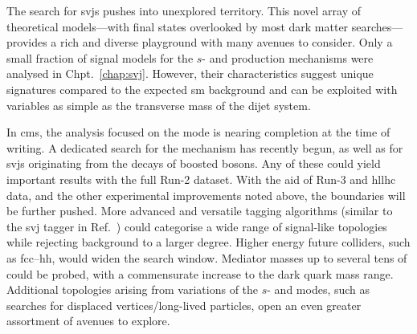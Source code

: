The search for \glspl{svj} pushes into unexplored territory. This novel array of theoretical models---with final states overlooked by most dark matter searches---provides a rich and diverse playground with many avenues to consider. Only a small fraction of signal models for the $s$- and \tchannel production mechanisms were analysed in Chpt.~\ref{chap:svj}. However, their characteristics suggest unique signatures compared to the expected \acrlong{sm} background and can be exploited with variables as simple as the transverse mass of the dijet system.

In \acrshort{cms}, the analysis focused on the \schannel mode is nearing completion at the time of writing. A dedicated search for the \tchannel mechanism has recently begun, as well as for \glspl{svj} originating from the decays of boosted \PZprime bosons. Any of these could yield important results with the full Run-2 dataset. With the aid of Run-3 and \acrshort{hllhc} data, and the other experimental improvements noted above, the boundaries will be further pushed. More advanced and versatile tagging algorithms (similar to the \gls{svj} tagger in Ref.~) could categorise a wide range of signal-like topologies while rejecting background to a larger degree. Higher energy future colliders, such as \acrshort{fcc}--hh, would widen the search window. Mediator masses up to several tens of \TeVns could be probed, with a commensurate increase to the dark quark mass range. Additional topologies arising from variations of the $s$- and \tchannel modes, such as searches for displaced vertices/long-lived particles, open an even greater assortment of avenues to explore.
